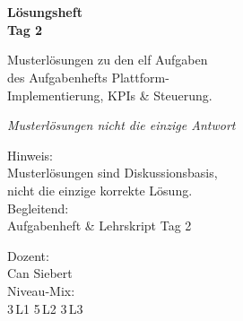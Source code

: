 \documentclass[11pt,a4paper,oneside]{article}
\newcommand{\caveatfontfallback}{\itshape}
\newcommand\caveatfont{\caveatfontfallback}%
\begin{document}
\begin{titlepage}
  \pagestyle{empty}
  \vspace*{1.5cm}
  \\[2pt]
  \noindent{\color{lpAccent}\rule{\linewidth}{1.2pt}}\\[4pt]

  \vspace{3cm}
  {\sffamily\fontsize{30}{34}\selectfont\bfseries\color{lpInk}Lösungsheft\\Tag 2\par}

  \vspace{0.7cm}
  {\sffamily\large\color{lpGray}Musterlösungen zu den elf Aufgaben\\des Aufgabenhefts \textendash{} Plattform-\\Implementierung, KPIs \& Steuerung.\par}

  \vspace{1.5cm}
  {\caveatfont\LARGE\color{lpGreen}Musterlösungen \textperiodcentered{} nicht die einzige Antwort}\par

  \vfill

  \noindent\begin{minipage}{0.55\linewidth}
    {\sffamily\footnotesize\color{lpGray}Hinweis:}\\
    {\sffamily\small\color{lpInk}Musterlösungen sind Diskussionsbasis,\\nicht die einzige korrekte Lösung.}\\[10pt]
    {\sffamily\footnotesize\color{lpGray}Begleitend:}\\
    {\sffamily\small\color{lpInk}Aufgabenheft \& Lehrskript Tag 2}
  \end{minipage}\hfill
  \begin{minipage}{0.4\linewidth}
    \raggedleft
    {\sffamily\footnotesize\color{lpGray}Dozent:}\\
    {\sffamily\small\color{lpInk}Can Siebert}\\[10pt]
    {\sffamily\footnotesize\color{lpGray}Niveau-Mix:}\\
    {\sffamily\small\color{lpInk}3\,L1 \textperiodcentered{} 5\,L2 \textperiodcentered{} 3\,L3}
  \end{minipage}

  \vspace{0.5cm}
  \noindent{\color{lpAccent}\rule{\linewidth}{0.6pt}}
\end{titlepage}
\end{document}
